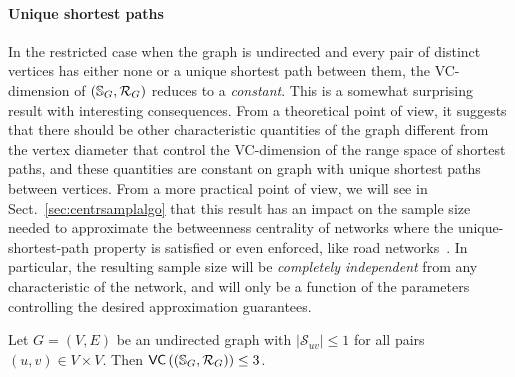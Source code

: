 \paragraph{Unique shortest paths}\label{sec:centrsamplrangeunique}
In the restricted case when the graph is undirected and
every pair of distinct vertices has either none or a unique shortest path
between them, the VC-dimension of $(\mathbb{S}_G,\mathcal{R}_G)$ reduces %
to a \emph{constant}. This is a somewhat surprising result with interesting
consequences. From a theoretical point of view, it suggests that there should be
other characteristic quantities of the graph different from the vertex diameter
that control the VC-dimension of the range space of shortest paths, and these
quantities are constant on graph with unique shortest paths between vertices.
From a more practical point of view, we will see in
Sect.~\ref{sec:centrsamplalgo} that this result has an impact on the sample size
needed to approximate the betweenness centrality of networks where the
unique-shortest-path property is satisfied or even enforced, like road
networks~\citep{GeisbergerSS08}. In particular, the resulting sample size will
be \emph{completely independent} from any characteristic of the network, and
will only be a function of the parameters controlling the desired approximation
guarantees. 

\begin{lemma}\label{lem:vcdimuppboundunique}
  Let $G=(V,E)$ be an undirected graph with $|\mathcal{S}_{uv}|\le1$ for all
  pairs $(u,v)\in V\times V$. Then $\mathsf{VC}\left((\mathbb{S}_G,\mathcal{R}_G)\right)\le 3$.
\end{lemma}

